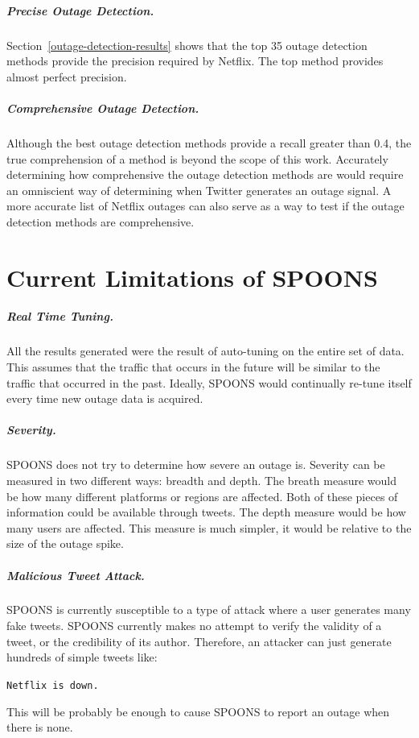 \documentclass[12pt]{ucthesis}
\begin{document}
\paragraph{Precise Outage Detection.}
Section~\ref{outage-detection-results} shows that the top 35 outage detection methods provide the precision required by Netflix.
The top method provides almost perfect precision.

\paragraph{Comprehensive Outage Detection.}
Although the best outage detection methods provide a recall greater than 0.4, the true comprehension of a method is beyond the scope of this work.
Accurately determining how comprehensive the outage detection methods are would require an omniscient way of determining when Twitter generates an outage signal.
A more accurate list of Netflix outages can also serve as a way to test if the outage detection methods are comprehensive.

\chapter{Current Limitations of SPOONS}
\label{limitations}
\paragraph{Real Time Tuning.}
All the results generated were the result of auto-tuning on the entire set of data.
This assumes that the traffic that occurs in the future will be similar to the traffic that occurred in the past.
Ideally, SPOONS would continually re-tune itself every time new outage data is acquired.

\paragraph{Severity.}
SPOONS does not try to determine how severe an outage is.
Severity can be measured in two different ways: breadth and depth.
The breath measure would be how many different platforms or regions are affected.
Both of these pieces of information could be available through tweets.
The depth measure would be how many users are affected.
This measure is much simpler, it would be relative to the size of the outage spike.

\paragraph{Malicious Tweet Attack.}
SPOONS is currently susceptible to a type of attack where a user generates many fake tweets.
SPOONS currently makes no attempt to verify the validity of a tweet, or the credibility of
its author. Therefore, an attacker can just generate hundreds of simple tweets like:
\begin{center}
   \texttt{Netflix is down.}
\end{center}
This will be probably be enough to cause SPOONS to report an outage when there is none.
\end{document}
